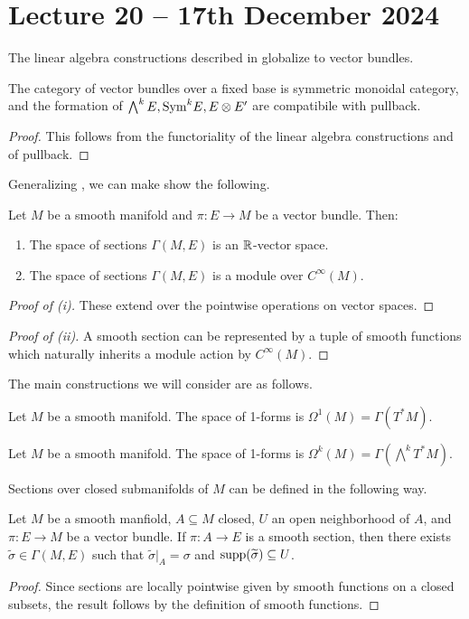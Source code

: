 \section{Lecture 20 -- 17th December 2024}\label{sec: lecture 20}
The linear algebra constructions described in  globalize to vector bundles. 
\begin{theorem}\label{def: omnibus linear algebra}
    The category of vector bundles over a fixed base is symmetric monoidal category, and the formation of $\bigwedge^{k}E, \mathrm{Sym}^{k}E, E\otimes E'$ are compatibile with pullback. 
\end{theorem}
\begin{proof}
    This follows from the functoriality of the linear algebra constructions and of pullback. 
\end{proof}
Generalizing , we can make show the following. 
\begin{lemma}\label{lem: linear algebra of space of sections}
    Let $M$ be a smooth manifold and $\pi:E\to M$ be a vector bundle. Then:
    \begin{enumerate}[label=(\roman*)]
        \item The space of sections $\Gamma(M,E)$ is an $\mathbb{R}$-vector space. 
        \item The space of sections $\Gamma(M,E)$ is a module over $C^{\infty}(M)$. 
    \end{enumerate}
\end{lemma}
\begin{proof}[Proof of (i)]
    These extend over the pointwise operations on vector spaces. 
\end{proof}
\begin{proof}[Proof of (ii)]
    A smooth section can be represented by a tuple of smooth functions which naturally inherits a module action by $C^{\infty}(M)$.
\end{proof}
The main constructions we will consider are as follows. 
\begin{definition}[1-Form]\label{def: 1-form}
    Let $M$ be a smooth manifold. The space of 1-forms is $\Omega^{1}(M)=\Gamma(T^{*}M)$. 
\end{definition}
\begin{definition}[$k$-Form]\label{def: k-form}
    Let $M$ be a smooth manifold. The space of 1-forms is $\Omega^{k}(M)=\Gamma(\bigwedge^{k}T^{*}M)$.
\end{definition}
Sections over closed submanifolds of $M$ can be defined in the following way. 
\begin{lemma}\label{lem: sections of vector bundles over smooth closed submanifolds}
    Let $M$ be a smooth manfiold, $A\subseteq M$ closed, $U$ an open neighborhood of $A$, and $\pi:E\to M$ be a vector bundle. If $\pi:A\to E$ is a smooth section, then there exists $\widetilde{\sigma}\in\Gamma(M,E)$ such that $\widetilde{\sigma}|_{A}=\sigma$ and $\mathrm{supp}(\widetilde{\sigma})\subseteq U$. 
\end{lemma}
\begin{proof}
    Since sections are locally pointwise given by smooth functions on a closed subsets, the result follows by the definition of smooth functions. 
\end{proof}